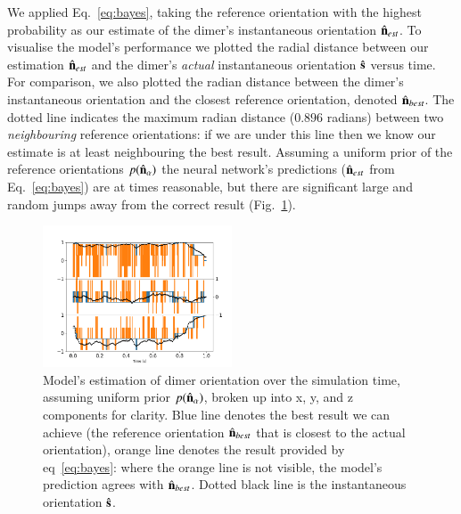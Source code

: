 \documentclass[preprint,  3p]{elsarticle}
\begin{document}
We applied Eq.~\eqref{eq:bayes}, taking the reference orientation with the highest probability  as our estimate of the dimer's instantaneous orientation $\hat{\bf n}_{est}$. To visualise the model's performance  we plotted the radial distance between our estimation $\hat{\bf n}_{est}$ and the dimer's \emph{actual} instantaneous orientation $\hat{\bf s}$ versus time. For comparison, we also plotted the radian distance between the  dimer's instantaneous orientation and the closest reference orientation, denoted $\hat{\bf n}_{best}$. The dotted line indicates the maximum radian distance ($0.896$ radians) between two \textit{neighbouring} reference orientations: if we are under this line then we know our estimate is at least neighbouring the best result. Assuming a uniform prior of the reference orientations $p(\hat{\bf n}_\alpha)$  the neural network's predictions ($\hat{\bf n}_{est}$ from Eq.~\eqref{eq:bayes}) are at times reasonable, but there are significant large and random jumps away from the correct result (Fig.~\ref{fig:uniform}). 

\begin{figure}[h]
	\centering
	\includegraphics[width=0.5\textwidth]{./Images/fig5.png}
	\caption{Model's estimation of dimer orientation over the simulation time, assuming uniform prior $p(\hat{\bf n}_\alpha)$, broken up into x, y, and z components for clarity. Blue line denotes the best result we can achieve (the reference orientation $\hat{\bf n}_{best}$ that is closest to the actual orientation), orange line denotes the result provided by eq~\ref{eq:bayes}: where the orange line is not visible, the model's prediction agrees with $\hat{\bf n}_{best}$. Dotted black line is the instantaneous orientation $\hat{\bf s}$.}
	\label{fig:uniform}
\end{figure} 
\end{document}
